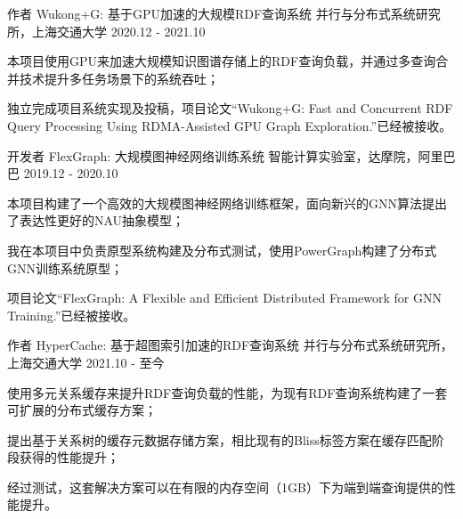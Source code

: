 \vspace{-2mm}


\vspace{1mm}

\begin{cventries}

\cventry
{作者} %
{Wukong+G: 基于GPU加速的大规模RDF查询系统} %
{并行与分布式系统研究所，上海交通大学} %
{2020.12 - 2021.10} %
{ %
	\begin{cvitems}
		\item {本项目使用GPU来加速大规模知识图谱存储上的RDF查询负载，并通过多查询合并技术提升多任务场景下的系统吞吐；}
		\item {独立完成项目系统实现及投稿，项目论文“Wukong+G: Fast and Concurrent RDF Query Processing Using RDMA-Assisted GPU Graph Exploration.”已经被接收。}
	\end{cvitems}
}

\vspace{-3mm}

\cventry
{开发者} %
{FlexGraph: 大规模图神经网络训练系统} %
{智能计算实验室，达摩院，阿里巴巴} %
{2019.12 - 2020.10} %
{ %
	\begin{cvitems}
	 \item {本项目构建了一个高效的大规模图神经网络训练框架，面向新兴的GNN算法提出了表达性更好的NAU抽象模型；}
	 \item {我在本项目中负责原型系统构建及分布式测试，使用PowerGraph构建了分布式GNN训练系统原型；}
	 \item {项目论文“FlexGraph: A Flexible and Efficient Distributed Framework for GNN Training.”已经被接收。}
	\end{cvitems}
}

\vspace{-3mm}

\cventry
{作者} %
{HyperCache: 基于超图索引加速的RDF查询系统} %
{并行与分布式系统研究所，上海交通大学} %
{2021.10 - 至今} %
{ %
	\begin{cvitems}
	 \item {使用多元关系缓存来提升RDF查询负载的性能，为现有RDF查询系统构建了一套可扩展的分布式缓存方案；}
	 \item {提出基于关系树的缓存元数据存储方案，相比现有的Bliss标签方案在缓存匹配阶段获得的性能提升；}
	 \item {经过测试，这套解决方案可以在有限的内存空间（1GB）下为端到端查询提供的性能提升。}
	\end{cvitems}
}


\end{cventries}
